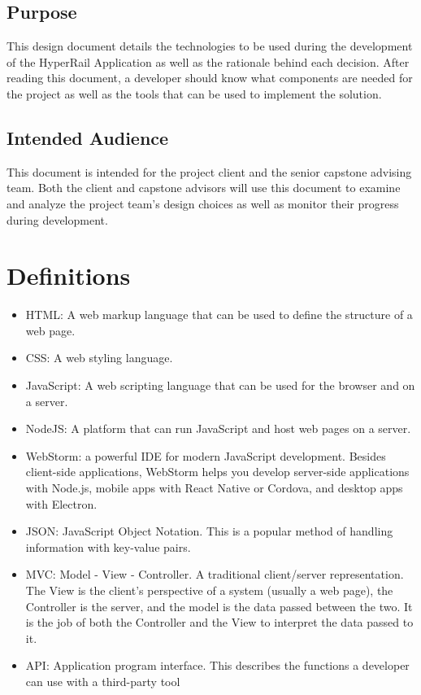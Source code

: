 \documentclass[onecolumn, draftclsnofoot,10pt, compsoc]{IEEEtran}
\begin{document}
\subsection{Purpose}
This design document details the technologies to be used during the development of the HyperRail Application as well as the rationale behind each decision. After reading this document, a developer should know what components are needed for the project as well as the tools that can be used to implement the solution.


\subsection{Intended Audience}
This document is intended for the project client and the senior capstone advising team. Both the client and capstone advisors will use this document to examine and analyze the project team's design choices as well as monitor their progress during development.


\section{Definitions}
\begin{itemize}
    \item HTML: A web markup language that can be used to define the structure of a web page.
    \item CSS: A web styling language.
    \item JavaScript: A web scripting language that can be used for the browser and on a server.
    \item NodeJS: A platform that can run JavaScript and host web pages on a server.
    \item WebStorm: a powerful IDE for modern JavaScript development. Besides client-side applications, WebStorm helps you develop server-side applications with Node.js, mobile apps with React Native or Cordova, and desktop apps with Electron.
    \item JSON: JavaScript Object Notation. This is a popular method of handling information with key-value pairs.
    \item MVC: Model - View - Controller. A traditional client/server representation. The View is the client's perspective of a system (usually a web page), the Controller is the server, and the model is the data passed between the two. It is the job of both the Controller and the View to interpret the data passed to it.
    \item API: Application program interface. This describes the functions a developer can use with a third-party tool
\end{itemize}
\end{document}
